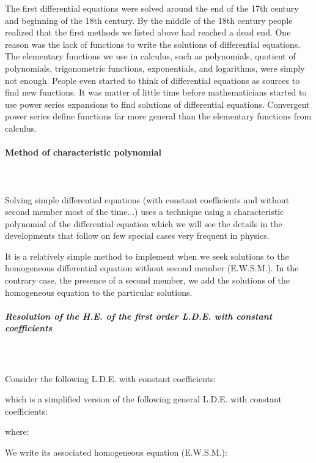 	\begin{tcolorbox}[title=Remark,colframe=black,arc=10pt]
	The first differential equations were solved around the end of the 17th century and beginning of the 18th century. By the middle of the 18th century people realized that the first methods we listed above had reached a dead end. One reason was the lack of functions to write the solutions of differential equations. The elementary functions we use in calculus, such as polynomials, quotient of polynomials, trigonometric functions, exponentials, and logarithms, were simply not enough. People even started to think of differential equations as sources to find new functions. It was matter of little time before mathematicians started to use power series expansions to find solutions of differential equations. Convergent power series define functions far more general than the elementary functions from calculus.
	\end{tcolorbox}
	
	\paragraph{Method of characteristic polynomial}\label{method of characteristic polynomial}\mbox{}\\\\
	Solving simple differential equations (with constant coefficients and without second member most of the time...) uses a technique using a characteristic polynomial of the differential equation which we will see the details in the developments that follow on  few special cases very frequent in physics.
	
	It is a relatively simple method to implement when we seek solutions to the homogeneous differential equation without second member (E.W.S.M.). In the contrary case, the presence of a second member, we add the solutions of the homogeneous equation to the particular solutions.
	
	\subparagraph{Resolution of the H.E. of the first order L.D.E. with constant coefficients}\label{first order lde with constant coefficients}\mbox{}\\\\

	Consider the following L.D.E. with constant coefficients:
	
	which is a simplified version of the following general L.D.E.  with constant coefficients:
	
	where:
	
	We write its associated homogeneous equation (E.W.S.M.):
	
